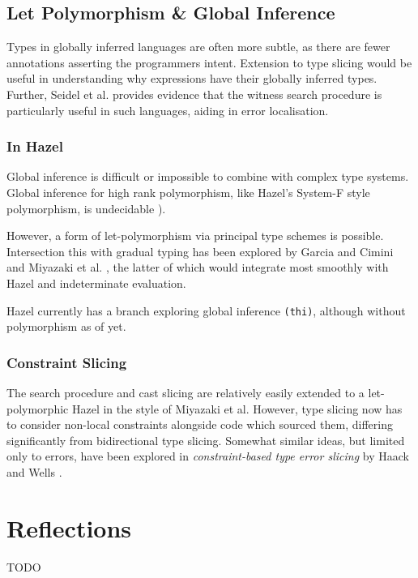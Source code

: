 \subsection{Let Polymorphism \& Global Inference}
Types in globally inferred languages are often more subtle, as there are fewer annotations asserting the programmers intent. Extension to type slicing would be useful in understanding why expressions have their globally inferred types. Further, Seidel et al. provides evidence that the witness search procedure is particularly useful in such languages, aiding in error localisation.

\subsubsection{In Hazel}
Global inference is difficult or impossible to combine with complex type systems. Global inference for high rank polymorphism, like Hazel's System-F style polymorphism, is undecidable \cite{SystemFUndecidable}). 

However, a form of let-polymorphism via principal type schemes \cite{PrincipleTypeSchemes} is possible. Intersection this with gradual typing has been explored by Garcia and Cimini \cite{GradualTI} and Miyazaki et al. \cite{DTI}, the latter of which would integrate most smoothly with Hazel and indeterminate evaluation. 

Hazel currently has a branch exploring global inference \texttt{(thi)}, although without polymorphism as of yet.

\subsubsection{Constraint Slicing}
The search procedure and cast slicing are relatively easily extended to a let-polymorphic Hazel in the style of Miyazaki et al. However, type slicing now has to consider non-local constraints alongside code which sourced them, differing significantly from bidirectional type slicing. Somewhat similar ideas, but limited only to errors, have been explored in \textit{constraint-based type error slicing} by Haack and Wells \cite{HaackErrSlice}.

\section{Reflections}
TODO